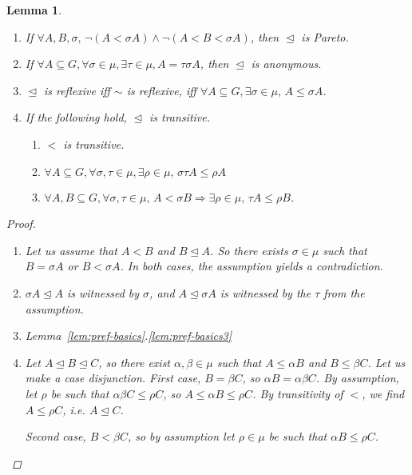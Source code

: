 \documentclass[11pt]{article}
\newtheorem{lemma}[definition]{Lemma}
\newcommand{\releq}{\mathrel{\trianglelefteq}}
\begin{document}
\begin{lemma}\label{lem:suff-cond}
\begin{enumerate}
 \item If $\forall A,B, \sigma, \,\neg(A < \sigma A) \land \neg(A < B < \sigma A)$, then $\releq$ is Pareto.
  
 \item If $\forall A \subseteq G, \forall \sigma \in \mu, \exists \tau \in \mu, A = \tau \sigma A$, then $\releq$ is anonymous.
 
 
 \item $\releq$ is reflexive iff $\sim$ is reflexive, iff $\forall A \subseteq G, \exists \sigma \in \mu,\, A \leq \sigma A$. 
 
 
 \item If the following hold, $\releq$ is transitive.
 \begin{enumerate}
  \item $<$ is transitive.
  
  \item $\forall A \subseteq G,\forall \sigma, \tau \in \mu,\exists \rho \in \mu,\, \sigma \tau A \leq \rho A$
 
 \item $\forall A,B \subseteq G, \forall \sigma, \tau \in \mu,\, A < \sigma B \Rightarrow \exists \rho \in \mu,\, \tau A \leq \rho B$.
 \end{enumerate}

 
\end{enumerate}
 
\begin{proof}
\begin{enumerate}
 \item Let us assume that $A < B$ and $B \releq A$. So there exists $\sigma \in \mu$ such that $B = \sigma A$ or $B < \sigma A$. In both cases, the assumption yields a contradiction.
 
 \item $\sigma A \releq A$ is witnessed by $\sigma$, and $A \releq \sigma A$ is witnessed by the $\tau$ from the assumption.
 
 \item Lemma~\ref{lem:pref-basics}.\ref{lem:pref-basics3}
 
 
 \item Let $A \releq B \releq C$, so there exist $\alpha, \beta \in \mu$ such that $A \leq \alpha B$ and $B \leq \beta C$. Let us make a case disjunction. First case, $B = \beta C$, so $\alpha B = \alpha \beta C$. By assumption, let $\rho$ be such that $\alpha \beta C \leq \rho C$, so $A \leq \alpha B \leq \rho C$. By transitivity of $<$, we find $A \leq \rho C$, i.e. $A \releq C$.
 
 Second case, $B < \beta C$, so by assumption let $\rho \in \mu$ be such that $\alpha B \leq \rho C$.
\end{enumerate}
\end{proof}

 
\end{lemma}
\end{document}
